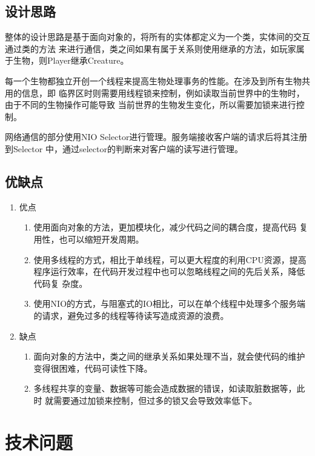 \documentclass{SCIS2022cn}
\begin{document}
\subsection{设计思路}

整体的设计思路是基于面向对象的，将所有的实体都定义为一个类，实体间的交互通过类的方法
来进行通信，类之间如果有属于关系则使用继承的方法，如玩家属于生物，则Player继承Creature。

每一个生物都独立开创一个线程来提高生物处理事务的性能。在涉及到所有生物共用的信息，即
临界区时则需要用线程锁来控制，例如读取当前世界中的生物时，由于不同的生物操作可能导致
当前世界的生物发生变化，所以需要加锁来进行控制。

网络通信的部分使用NIO Selector进行管理。服务端接收客户端的请求后将其注册到Selector
中，通过selector的判断来对客户端的读写进行管理。

\subsection{优缺点}

\begin{enumerate}
    \item 优点
    \begin{enumerate}
        \item 使用面向对象的方法，更加模块化，减少代码之间的耦合度，提高代码
        复用性，也可以缩短开发周期。
        \item 使用多线程的方式，相比于单线程，可以更大程度的利用CPU资源，提高
        程序运行效率，在代码开发过程中也可以忽略线程之间的先后关系，降低代码复
        杂度。
        \item 使用NIO的方式，与阻塞式的IO相比，可以在单个线程中处理多个服务端
        的请求，避免过多的线程等待读写造成资源的浪费。
    \end{enumerate}
    
    \item 缺点
    \begin{enumerate}
        \item 面向对象的方法中，类之间的继承关系如果处理不当，就会使代码的维护
        变得很困难，代码可读性下降。
        \item 多线程共享的变量、数据等可能会造成数据的错误，如读取脏数据等，此时
        就需要通过加锁来控制，但过多的锁又会导致效率低下。
    \end{enumerate}
\end{enumerate}

\section{技术问题}
\end{document}
